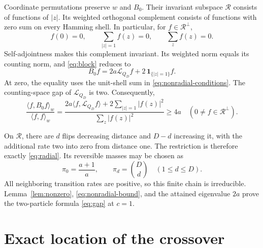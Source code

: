 \documentclass[11pt,a4paper]{article}
\newcommand{\ind}{\mathbf{1}}
\newcommand{\ip}[2]{\langle #1,#2\rangle}
\begin{document}
Coordinate permutations preserve $w$ and $B_0$. Their invariant subspace
$\mathcal R$ consists of functions of $|z|$. Its weighted orthogonal
complement consists of functions with zero sum on every Hamming shell.
In particular, for $f\in\mathcal R^\perp$,
\begin{equation}\label{eq:nonradial-conditions}
 f(0)=0,\qquad \sum_{|z|=1}f(z)=0,\qquad \sum_z f(z)=0.
\end{equation}
Self-adjointness makes this complement invariant. Its weighted norm
equals its counting norm, and \eqref{eq:block} reduces to
\begin{equation}\label{eq:nonradial-action}
 B_0 f=2a\mathcal L_{Q_D}f+2\,\ind_{\{|z|=1\}}f.
\end{equation}
At zero, the equality uses the unit-shell sum in
\eqref{eq:nonradial-conditions}. The counting-space gap of
$\mathcal L_{Q_D}$ is two. Consequently,
\begin{equation}\label{eq:nonradial-bound}
 \frac{\ip{f}{B_0 f}_w}{\ip{f}{f}_w}
 =\frac{2a\ip{f}{\mathcal L_{Q_D}f}+2\sum_{|z|=1}|f(z)|^2}
 {\sum_z|f(z)|^2}\geq4a
 \quad(0\ne f\in\mathcal R^\perp).
\end{equation}

On $\mathcal R$, there are $d$ flips decreasing distance and $D-d$
increasing it, with the additional rate two into zero from distance one.
The restriction is therefore exactly \eqref{eq:radial}. Its reversible
masses may be chosen as
\begin{equation}\label{eq:radial-weights}
 \pi_0=\frac{a+1}{a},\qquad \pi_d=\binom Dd\quad(1\leq d\leq D).
\end{equation}
All neighboring transition rates are positive, so this finite chain is
irreducible. Lemma~\ref{lem:nonzero}, \eqref{eq:nonradial-bound}, and
the attained eigenvalue $2a$ prove the two-particle formula
\eqref{eq:gap} at $c=1$.

\section{Exact location of the crossover}
\end{document}
